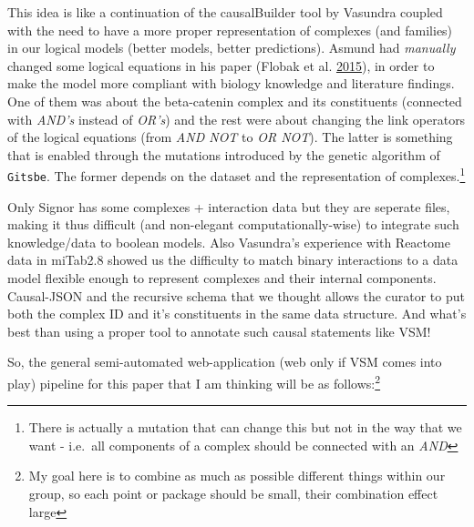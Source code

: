 \documentclass[12pt,]{book}
\let\rmarkdownfootnote\footnote%
\def\footnote{\protect\rmarkdownfootnote}
\begin{document}
This idea is like a continuation of the causalBuilder tool by Vasundra coupled with the
need to have a more proper representation of complexes (and families) in our
logical models (better models, better predictions). Asmund had \emph{manually} changed some logical equations in his paper
(Flobak et al. \protect\hyperlink{ref-Flobak2015}{2015}), in order to make the model more compliant with biology knowledge
and literature findings. One of them was about the beta-catenin complex and its
constituents (connected with \emph{AND's} instead of \emph{OR's}) and the rest were about changing the link operators of the logical
equations (from \emph{AND NOT} to \emph{OR NOT}). The latter is something that is enabled
through the mutations introduced by the genetic algorithm of \texttt{Gitsbe}. The former
depends on the dataset and the representation of complexes.\footnote{There is actually a mutation that can change this but not in the way that we want - i.e.~all components of a complex
  should be connected with an \emph{AND}}

Only Signor has some complexes + interaction data but they are seperate files, making it thus difficult (and non-elegant computationally-wise) to integrate such knowledge/data to boolean models. Also Vasundra's experience with Reactome data in miTab2.8 showed us the difficulty to match binary interactions to a data model flexible enough to represent complexes and their internal components. Causal-JSON and the recursive schema that we thought allows the curator to put both the complex ID and it's constituents in the same data structure. And what's best than using a proper tool to annotate such causal statements like VSM!

So, the general semi-automated web-application (web only if VSM comes into play) pipeline for this paper that I am thinking will be as follows:\footnote{My goal here is to combine as much as possible different things within our group,
  so each point or package should be small, their combination effect large}
\end{document}
